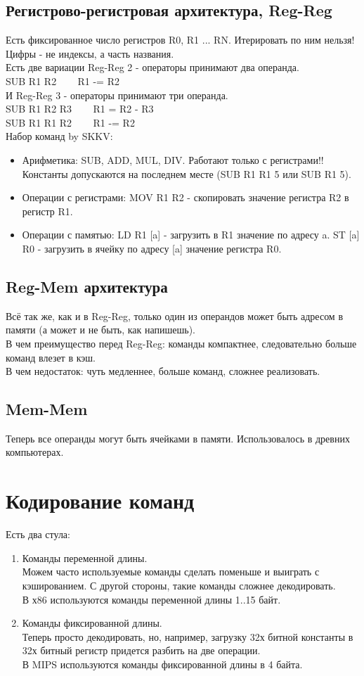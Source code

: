 \documentclass[12pt, a4paper]{article}
\begin{document}
\subsection{Регистрово-регистровая архитектура, Reg-Reg}
Есть фиксированное число регистров R0, R1 ... RN. Итерировать по ним нельзя! Цифры - не индексы, а часть названия.\\
Есть две вариации Reg-Reg 2 - операторы принимают два операнда.\\
SUB R1 R2 ~~~ R1 -= R2\\
И Reg-Reg 3 - операторы принимают три операнда.\\
SUB R1 R2 R3 ~~~ R1 = R2 - R3\\
SUB R1 R1 R2 ~~~ R1 -= R2\\
Набор команд by SKKV:
\begin{itemize}
    \item Арифметика: SUB, ADD, MUL, DIV. Работают только с регистрами!! Константы допускаются на последнем месте (SUB R1 R1 5 или SUB R1 5).
    \item Операции с регистрами: MOV R1 R2 - скопировать значение регистра R2 в регистр R1.
    \item Операции с памятью: LD R1 [a] - загрузить в R1 значение по адресу a. ST [a] R0 - загрузить в ячейку по адресу [a] значение регистра R0.
\end{itemize}
\subsection{Reg-Mem архитектура}
Всё так же, как и в Reg-Reg, только один из операндов может быть адресом в памяти (а может и не быть, как напишешь).\\
В чем преимущество перед Reg-Reg: команды компактнее, следовательно больше команд влезет в кэш.\\
В чем недостаток: чуть медленнее, больше команд, сложнее реализовать.
\subsection{Mem-Mem}
Теперь все операнды могут быть ячейками в памяти. Использовалось в древних компьютерах.
\section{Кодирование команд}
Есть два стула:
\begin{enumerate}
    \item Команды переменной длины.\\
    Можем часто используемые команды сделать поменьше и выиграть с кэшированием. С другой стороны, такие команды сложнее декодировать.\\
    В х86 используются команды переменной длины 1..15 байт.
    \item Команды фиксированной длины.\\
    Теперь просто декодировать, но, например, загрузку 32х битной константы в 32х битный регистр придется разбить на две операции.\\
    В MIPS используются команды фиксированной длины в 4 байта.
\end{enumerate}
\end{document}
